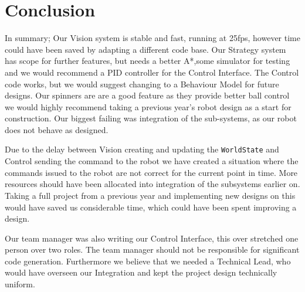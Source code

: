 \section{Conclusion}

In summary; Our Vision system is stable and fast, running at 25fps, however
time could have been saved by adapting a different code base. Our Strategy
system has scope for further features, but needs a better A*,some simulator for
testing and we would recommend a PID controller for the Control Interface. The
Control code works, but we would suggest changing to a Behaviour Model for
future designs. Our spinners are are a good feature as they provide better ball
control we would highly recommend taking a previous year's robot design as
a start for construction. Our biggest failing was integration of the
sub-systems, as our robot does not behave as designed. 

Due to the delay between Vision creating and updating the \texttt{WorldState} and
Control sending the command to the robot we have created a situation where the
commands issued to the robot are not correct for the current point in time.
More resources should have been allocated into integration of the
subsystems earlier on. Taking a full project from a previous year and
implementing new designs on this would have saved us considerable time, which
could have been spent improving a design.

Our team manager was also writing our Control Interface, this over stretched
one person over two roles. The team manager should not be responsible for
significant code generation. Furthermore we believe that we needed a Technical
Lead, who would have overseen our Integration and kept the project design
technically uniform.
